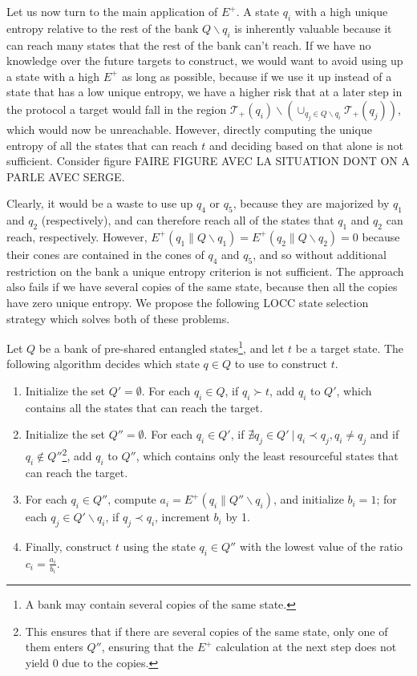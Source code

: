 Let us now turn to the main application of $E^+$. A state $q_i$ with a high unique entropy relative to the rest of the bank $Q \backslash q_i$ is inherently valuable because it can reach many states that the rest of the bank can't reach. If we have no knowledge over the future targets to construct, we would want to avoid using up a state with a high $E^+$ as long as possible, because if we use it up instead of a state that has a low unique entropy, we have a higher risk that at a later step in the protocol a target would fall in the region
$\mathcal{T}_+(q_i) \backslash \left(\cup_{q_j \in Q \backslash q_i} \mathcal{T}_+(q_j)\right)$, which would now be unreachable. However, directly computing the unique entropy of all the states that can reach $t$ and deciding based on that alone is not sufficient. Consider figure FAIRE FIGURE AVEC LA SITUATION DONT ON A PARLE AVEC SERGE. 

Clearly, it would be a waste to use up $q_4$ or $q_5$, because they are majorized by $q_1$ and $q_2$ (respectively), and can therefore reach all of the states that $q_1$ and $q_2$ can reach, respectively. However, $E^+(q_1 \parallel Q \backslash q_1) = E^+(q_2 \parallel Q \backslash q_2) = 0$ because their cones are contained in the cones of $q_4$ and $q_5$, and so without additional restriction on the bank a unique entropy criterion is not sufficient. The approach also fails if we have several copies of the same state, because then all the copies have zero unique entropy. We propose the following LOCC state selection strategy which solves both of these problems.

\begin{definition} \label{strat:unique_entropy}
    Let $Q$ be a bank of pre-shared entangled states\footnote{A bank may contain several copies of the same state.}, and let $t$ be a target state. The following algorithm decides which state $q \in Q$ to use to construct $t$.
    \begin{enumerate}
        \item Initialize the set $Q' = \emptyset$. For each $q_i \in Q$, if $q_i \succ t$, add $q_i$ to $Q'$, which contains all the states that can reach the target.
        \item Initialize the set $Q'' = \emptyset$. For each $q_i \in Q'$, if $\nexists q_j \in Q' \: | \: q_i \prec q_j, q_i \neq q_j$ and if $q_i \notin Q''$\footnote{This ensures that if there are several copies of the same state, only one of them enters $Q''$, ensuring that the $E^+$ calculation at the next step does not yield 0 due to the copies.}, add $q_i$ to $Q''$, which contains only the least resourceful states that can reach the target.
        \item For each $q_i \in Q''$, compute $a_i = E^+(q_i \parallel Q'' \backslash q_i)$, and initialize $b_i = 1$; for each $q_j \in Q' \backslash q_i$, if $q_j \prec q_i$, increment $b_i$ by 1. \label{step:volume}
        \item Finally, construct $t$ using the state $q_i \in Q''$ with the lowest value of the ratio $c_i = \frac{a_i}{b_i}$.
    \end{enumerate}
\end{definition}

